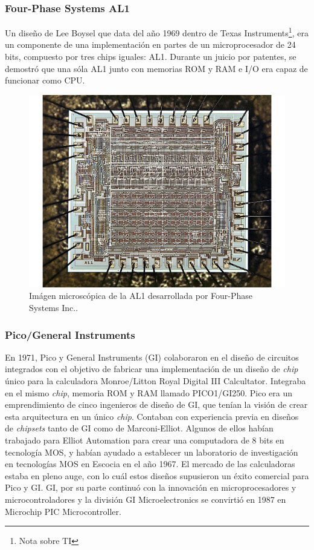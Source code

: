 \subsubsection{Four-Phase Systems AL1}

Un diseño de Lee Boysel que data del año 1969 dentro de Texas Instruments\footnote{Nota sobre TI}, era un componente de una implementación en partes de un microprocesador de 24 bits, compuesto por tres chips iguales: AL1. Durante un juicio por patentes, se demostró que una sóla AL1 junto con memorias ROM y RAM e I/O era capaz de funcionar como CPU.

\begin{figure}
  \centering
  \includegraphics[scale=0.5]{./figures/C02-al1}
  \captionsetup{justification=centering}
  \caption{Imágen microscópica de la AL1 desarrollada por Four-Phase Systems Inc..}
  \label{fig:C02-al1}
\end{figure}


\subsubsection{Pico/General Instruments}

En 1971, Pico y General Instruments (GI) colaboraron en el diseño de circuitos integrados con el objetivo de fabricar una implementación de un diseño de \emph{chip} único para la calculadora Monroe/Litton Royal Digital III Calcultator. Integraba en el mismo \emph{chip}, memoria ROM y RAM llamado PICO1/GI250. Pico era un emprendimiento de cinco ingenieros de diseño de GI, que tenían la visión de crear esta arquitectura en un único \emph{chip}. Contaban con experiencia previa en diseños de \emph{chipsets} tanto de GI como de Marconi-Elliot. Algunos de ellos habían trabajado para Elliot Automation para crear una computadora de 8 bits en tecnología MOS, y habían ayudado a establecer un laboratorio de investigación en tecnologías MOS en Escocia en el año 1967. El mercado de las calculadoras estaba en pleno auge, con lo cuál estos diseños supusieron un éxito comercial para Pico y GI. GI, por su parte continuó con la innovación en microprocesadores  y microcontroladores y la división GI Microelectronics se convirtió en 1987 en Microchip PIC Microcontroller.

